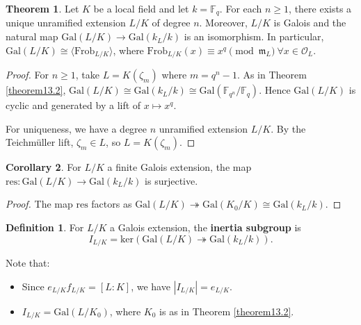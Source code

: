 \documentclass{article}
\theoremstyle{definition}
\newtheorem{theorem}{Theorem}[section]
\newtheorem{cor}[theorem]{Corollary}
\newtheorem{defn}{Definition}[section]
\begin{document}
\begin{theorem}
    Let $K$ be a local field and let $k = \mathbb{F}_q$. For each $n\ge 1$, there exists a unique unramified extension $L/K$ of degree $n$. Moreover, $L/K$ is Galois and the natural map $\text{Gal}(L/K) \to \text{Gal}(k_L/k)$ is an isomorphism. In particular, $\text{Gal}(L/K) \cong \langle \text{Frob}_{L/K} \rangle$, where $\text{Frob}_{L/K}(x) \equiv x^q \pmod{\mathfrak{m}_L} ~\forall x \in \mathcal{O}_L$.
\end{theorem}
\begin{proof}
    For $n\ge 1$, take $L = K(\zeta_m)$ where $m = q^n-1$. As in Theorem \ref{theorem13.2}, $\text{Gal}(L/K) \cong \text{Gal}(k_L/k) \cong \text{Gal}(\mathbb{F}_{q^n}/\mathbb{F}_q)$. Hence $\text{Gal}(L/K)$ is cyclic and generated by a lift of $x \mapsto x^q$. 
    \vspace{1mm}
     
    For uniqueness, we have a degree $n$ unramified extension $L/K$. By the Teichmüller lift, $\zeta_m \in L$, so $L = K(\zeta_m)$.
\end{proof}
\begin{cor}
    For $L/K$ a finite Galois extension, the map $\text{res} : \text{Gal}(L/K) \to \text{Gal}(k_L/k)$ is surjective.
\end{cor}
\begin{proof}
    The map $\text{res}$ factors as $\text{Gal}(L/K) \twoheadrightarrow \text{Gal}(K_0/K) \cong \text{Gal}(k_L/k)$.
\end{proof}
\begin{defn}
    For $L/K$ a Galois extension, the \textbf{inertia subgroup} is \[
    I_{L/K} = \text{ker}(\text{Gal}(L/K) \twoheadrightarrow \text{Gal}(k_L/k)).
    \]
\end{defn}
Note that:
\begin{itemize}
    \item Since $e_{L/K}f_{L/K} = [L:K]$, we have $|I_{L/K}| = e_{L/K}$.
    \item $I_{L/K} = \text{Gal}(L/K_0)$, where $K_0$ is as in Theorem \ref{theorem13.2}.
\end{itemize}
\end{document}
